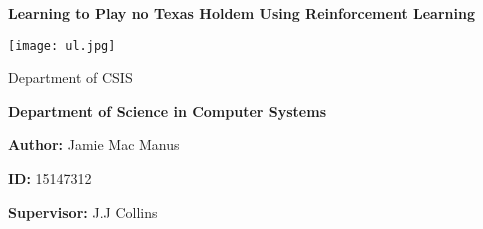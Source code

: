 
\begin{titlepage}

    \begin{center}

        \vspace*{1.5cm}

        \Huge

        \textbf{Learning to Play no Texas Holdem Using Reinforcement Learning}

        \texttt{[image: ul.jpg]}

        \Large
        Department of CSIS

        \vspace{.25cm}
        \textbf{Department of Science in Computer Systems}

        \vspace{.25cm}
        \textbf{Author: } Jamie Mac Manus

        \vspace{.25cm}
        \textbf{ID: } 15147312

        \vspace{.25cm}
        \textbf{Supervisor: } J.J Collins

    \end{center}

\end{titlepage}